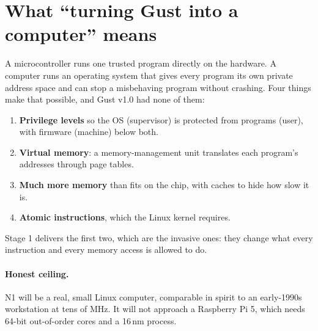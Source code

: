 \documentclass[10pt,a4paper]{article}
\begin{document}
\section{What ``turning Gust into a computer'' means}
A microcontroller runs one trusted program directly on the hardware. A computer runs an operating system that gives every program its own private address space and can stop a misbehaving program without crashing. Four things make that possible, and Gust v1.0 had none of them:
\begin{enumerate}
\item \textbf{Privilege levels} so the OS (supervisor) is protected from programs (user), with firmware (machine) below both.
\item \textbf{Virtual memory}: a memory-management unit translates each program's addresses through page tables.
\item \textbf{Much more memory} than fits on the chip, with caches to hide how slow it is.
\item \textbf{Atomic instructions}, which the Linux kernel requires.
\end{enumerate}
Stage 1 delivers the first two, which are the invasive ones: they change what every instruction and every memory access is allowed to do.

\paragraph{Honest ceiling.} N1 will be a real, small Linux computer, comparable in spirit to an early-1990s workstation at tens of MHz. It will not approach a Raspberry Pi 5, which needs 64-bit out-of-order cores and a 16\,nm process.
\end{document}
